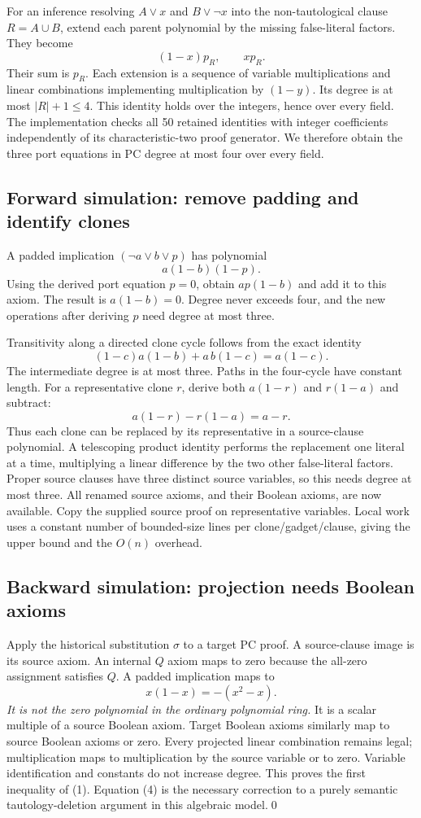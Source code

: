 \documentclass[11pt]{article}
\begin{document}
For an inference resolving $A\lor x$ and $B\lor\neg x$ into the non-tautological clause $R=A\cup B$, extend each parent polynomial by the missing false-literal factors. They become
\[
 (1-x)p_R,\qquad x p_R.
\]
Their sum is $p_R$. Each extension is a sequence of variable multiplications and linear combinations implementing multiplication by $(1-y)$. Its degree is at most $|R|+1\le4$. This identity holds over the integers, hence over every field. The implementation checks all 50 retained identities with integer coefficients independently of its characteristic-two proof generator. We therefore obtain the three port equations in PC degree at most four over every field.

\subsection{Forward simulation: remove padding and identify clones}
A padded implication $(\neg a\lor b\lor p)$ has polynomial
\[
 a(1-b)(1-p).
\]
Using the derived port equation $p=0$, obtain $ap(1-b)$ and add it to this axiom. The result is $a(1-b)=0$. Degree never exceeds four, and the new operations after deriving $p$ need degree at most three.

Transitivity along a directed clone cycle follows from the exact identity
\[
 (1-c)a(1-b)+a\,b(1-c)=a(1-c).
\tag{2}
\]
The intermediate degree is at most three. Paths in the four-cycle have constant length. For a representative clone $r$, derive both $a(1-r)$ and $r(1-a)$ and subtract:
\[
 a(1-r)-r(1-a)=a-r.
\tag{3}
\]
Thus each clone can be replaced by its representative in a source-clause polynomial. A telescoping product identity performs the replacement one literal at a time, multiplying a linear difference by the two other false-literal factors. Proper source clauses have three distinct source variables, so this needs degree at most three. All renamed source axioms, and their Boolean axioms, are now available. Copy the supplied source proof on representative variables. Local work uses a constant number of bounded-size lines per clone/gadget/clause, giving the upper bound and the $O(n)$ overhead.

\subsection{Backward simulation: projection needs Boolean axioms}
Apply the historical substitution $\sigma$ to a target PC proof. A source-clause image is its source axiom. An internal $Q$ axiom maps to zero because the all-zero assignment satisfies $Q$. A padded implication maps to
\[
 x(1-x)=-(x^2-x).
\tag{4}
\]
\emph{It is not the zero polynomial in the ordinary polynomial ring.} It is a scalar multiple of a source Boolean axiom. Target Boolean axioms similarly map to source Boolean axioms or zero. Every projected linear combination remains legal; multiplication maps to multiplication by the source variable or to zero. Variable identification and constants do not increase degree. This proves the first inequality of (1). Equation (4) is the necessary correction to a purely semantic tautology-deletion argument in this algebraic model.\qed
\end{document}
